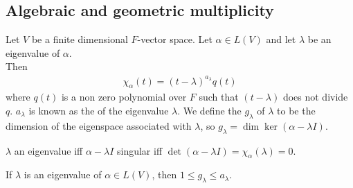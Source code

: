 \subsection{Algebraic and geometric multiplicity}
\begin{definition}
	Let $V$ be a finite dimensional $F$-vector space.
	Let $\alpha \in L(V)$ and let $\lambda$ be an eigenvalue of $\alpha$. \\
	Then
	\begin{align*}
		\chi_\alpha(t) = (t-\lambda)^{a_\lambda} q(t)
	\end{align*}
	where $q(t)$ is a non zero polynomial over $F$ such that $(t-\lambda)$ does not divide $q$.
	$a_\lambda$ is known as the  of the eigenvalue $\lambda$.
	We define the  $g_\lambda$ of $\lambda$ to be the dimension of the eigenspace associated with $\lambda$, so $g_\lambda = \dim \ker (\alpha - \lambda I)$.
\end{definition}

\begin{remark}
	$\lambda$ an eigenvalue iff $\alpha - \lambda I$ singular iff $\det(\alpha - \lambda I) = \chi_\alpha(\lambda) = 0$.
\end{remark} 

\begin{lemma}
	If $\lambda$ is an eigenvalue of $\alpha \in L(V)$, then $1 \leq g_\lambda \leq a_\lambda$.
\end{lemma}

